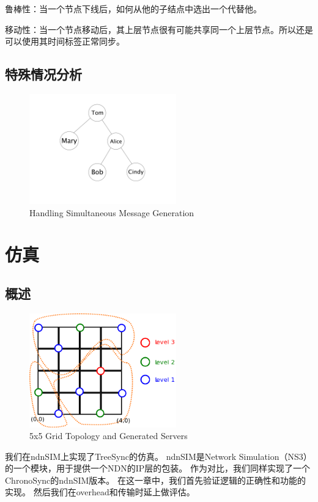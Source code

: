 \documentclass[a4paper]{article}
\begin{document}
鲁棒性：当一个节点下线后，如何从他的子结点中选出一个代替他。

移动性：当一个节点移动后，其上层节点很有可能共享同一个上层节点。所以还是可以使用其时间标签正常同步。

\subsection{特殊情况分析}

\begin{figure}[!t]
\centering
\includegraphics[width=2.5in]{../png/merit.png}
\caption{Handling Simultaneous Message Generation}
\label{merit}
\end{figure}

\section{仿真}
\subsection{概述}

\begin{figure}[!t]
\centering
\includegraphics[width=2.5in]{../png/paper-topo.png}
\caption{5x5 Grid Topology and Generated Servers}
\label{paper_topo}
\end{figure}

我们在ndnSIM上实现了TreeSync的仿真。
ndnSIM是Network Simulation（NS3）的一个模块，用于提供一个NDN的IP层的包装。
作为对比，我们同样实现了一个ChronoSync的ndnSIM版本。
在这一章中，我们首先验证逻辑的正确性和功能的实现。
然后我们在overhead和传输时延上做评估。
\end{document}
